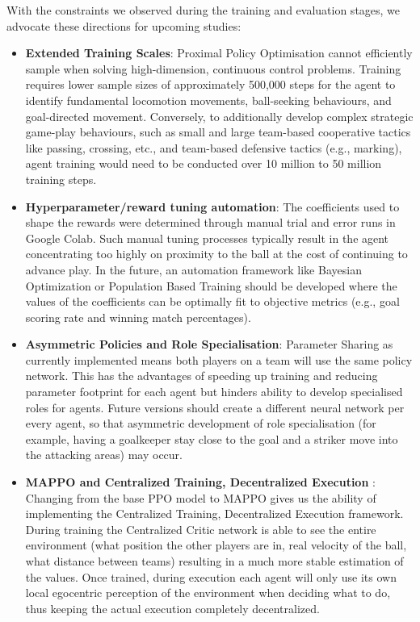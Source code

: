 With the constraints we observed during the training and evaluation stages, we advocate these directions for upcoming studies:
\begin{itemize}
    \item \textbf{Extended Training Scales}: Proximal Policy Optimisation cannot efficiently sample when solving high-dimension, continuous control problems. Training requires lower sample sizes of approximately 500,000 steps for the agent to identify fundamental locomotion movements, ball-seeking behaviours, and goal-directed movement.  Conversely, to additionally develop complex strategic game-play behaviours, such as small and large team-based cooperative tactics like passing, crossing, etc., and team-based defensive tactics (e.g., marking), agent training would need to be conducted over 10 million to 50 million training steps.
    \item \textbf{Hyperparameter/reward tuning automation}: The coefficients used to shape the rewards were determined through manual trial and error runs in Google Colab.  Such manual tuning processes typically result in the agent concentrating too highly on proximity to the ball at the cost of continuing to advance play.  In the future, an automation framework like Bayesian Optimization or Population Based Training should be developed where the values of the coefficients can be optimally fit to objective metrics (e.g., goal scoring rate and winning match percentages).
    \item \textbf{Asymmetric Policies and Role Specialisation}: Parameter Sharing as currently implemented means both players on a team will use the same policy network. This has the advantages of speeding up training and reducing parameter footprint for each agent but hinders ability to develop specialised roles for agents. Future versions should create a different neural network per every agent, so that asymmetric development of role specialisation (for example, having a goalkeeper stay close to the goal and a striker move into the attacking areas) may occur.
    \item \textbf{MAPPO and Centralized Training, Decentralized Execution
}: Changing from the base PPO model to MAPPO gives us the ability of implementing the Centralized Training, Decentralized Execution framework. During training the Centralized Critic network is able to see the entire environment (what position the other players are in, real velocity of the ball, what distance between teams) resulting in a much more stable estimation of the values. Once trained, during execution each agent will only use its own local egocentric perception of the environment when deciding what to do, thus keeping the actual execution completely decentralized.
\end{itemize}

